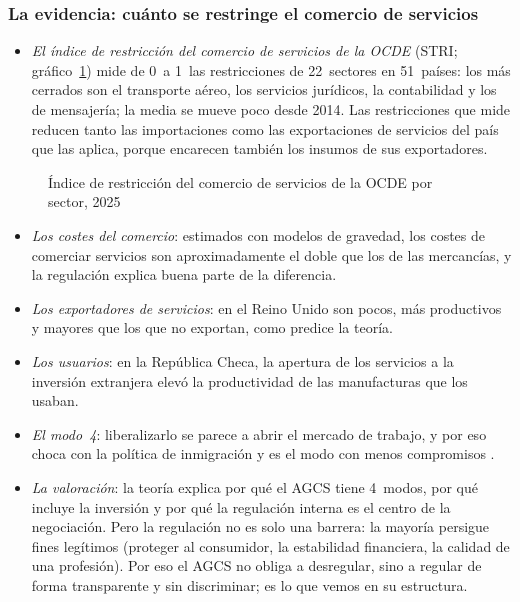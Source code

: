 \documentclass[11pt]{article}
\begin{document}
\subsubsection{La evidencia: cuánto se restringe\cortetitulo{} el comercio de servicios}\label{sec:servicios-evidencia}

\begin{itemize}
\item \emph{El índice de restricción del comercio de servicios de la OCDE} (STRI; gráfico~\ref{fig:stri}) mide de 0~a 1~las restricciones de 22~sectores en 51~países: los más cerrados son el transporte aéreo, los servicios jurídicos, la contabilidad y los de mensajería; la media se mueve poco desde 2014\nocite{OCDE2026STRI}. Las restricciones que mide reducen tanto las importaciones como las exportaciones de servicios del país que las aplica, porque encarecen también los insumos de sus exportadores\nocite{NordasRouzet2017Impact}.
\end{itemize}

\begin{figure}[H]
\centering
\caption{Índice de restricción del comercio de servicios de la OCDE por sector, 2025}\label{fig:stri}
\end{figure}

\begin{itemize}
\item \emph{Los costes del comercio}: estimados con modelos de gravedad, los costes de comerciar servicios son aproximadamente el doble que los de las mercancías, y la regulación explica buena parte de la diferencia\nocite{OMC2019InformeServicios,BenzJaax2022Costs}.
\item \emph{Los exportadores de servicios}: en el Reino Unido son pocos, más productivos y mayores que los que no exportan, como predice la teoría\nocite{BreinlichCriscuolo2011International}.
\item \emph{Los usuarios}: en la República Checa, la apertura de los servicios a la inversión extranjera elevó la productividad de las manufacturas que los usaban\nocite{ArnoldJavorcikMattoo2011Does}.
\item \emph{El modo~4}: liberalizarlo se parece a abrir el mercado de trabajo, y por eso choca con la política de inmigración y es el modo con menos compromisos .
\item \emph{La valoración}: la teoría explica por qué el AGCS tiene 4~modos, por qué incluye la inversión y por qué la regulación interna es el centro de la negociación. Pero la regulación no es solo una barrera: la mayoría persigue fines legítimos (proteger al consumidor, la estabilidad financiera, la calidad de una profesión). Por eso el AGCS no obliga a desregular, sino a regular de forma transparente y sin discriminar; es lo que vemos en su estructura.
\end{itemize}
\end{document}
